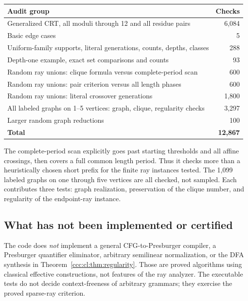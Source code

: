 \documentclass[11pt,letterpaper]{article}
\theoremstyle{definition}
\theoremstyle{remark}
\begin{document}
\begin{center}\small
\begin{tabular}{@{}P{.69\textwidth}r@{}}
\toprule
\textbf{Audit group} & \textbf{Checks}\\
\midrule
Generalized CRT, all moduli through 12 and all residue pairs & 6,084\\
Basic edge cases & 5\\
Uniform-family supports, literal generations, counts, depths, classes & 288\\
Depth-one example, exact set comparisons and counts & 93\\
Random ray unions: clique formula versus complete-period scan & 600\\
Random ray unions: pair criterion versus all length phases & 600\\
Random ray unions: literal crossover generations & 1,800\\
All labeled graphs on 1--5 vertices: graph, clique, regularity checks & 3,297\\
Larger random graph reductions & 100\\
\midrule
\textbf{Total} & \textbf{12,867}\\
\bottomrule
\end{tabular}
\end{center}

The complete-period scan explicitly goes past starting thresholds and
all affine crossings, then covers a full common length period. Thus it
checks more than a heuristically chosen short prefix for the finite ray
instances tested. The 1,099 labeled graphs on one through five vertices
are all checked, not sampled. Each contributes three tests: graph
realization, preservation of the clique number, and regularity of the
endpoint-ray instance.

\subsection{What has not been implemented or certified}

The code does \emph{not} implement a general CFG-to-Presburger compiler,
a Presburger quantifier eliminator, arbitrary semilinear normalization,
or the DFA synthesis in Theorem~\ref{ccc:cl:thm:regularity}. Those are proved
algorithms using classical effective constructions, not features of the
ray analyzer. The executable tests do not decide context-freeness of
arbitrary grammars; they exercise the proved sparse-ray criterion.
\end{document}

